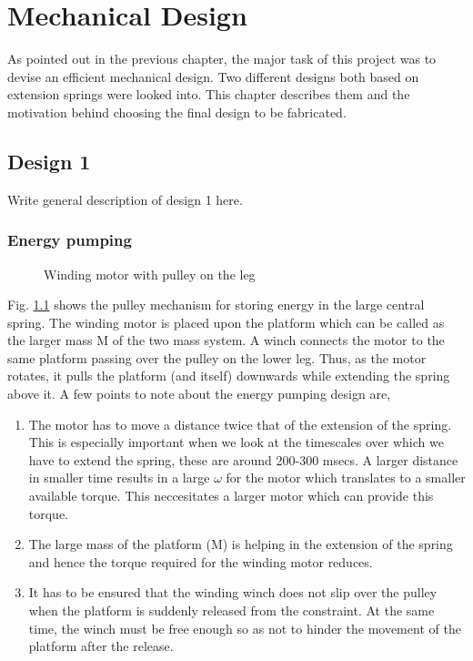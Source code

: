 \chapter{Mechanical Design}
\label{chap:mech_design}
As pointed out in the previous chapter, the major task of this project was to devise an efficient mechanical
design. Two different designs both based on extension springs were looked into. 
This chapter describes them and the motivation behind choosing the final design to be fabricated.

\section{Design 1}
Write general description of design 1 here.
\subsection{Energy pumping}
\begin{figure}[!h]
\centering
\caption{Winding motor with pulley on the leg}
\label{fig:3_pratik_design}
\end{figure}
Fig. \ref{fig:3_pratik_design} shows the pulley mechanism for storing energy in the large central spring.
The winding motor is placed upon the platform which can be called as the larger mass M of the two mass
system. A winch connects the motor to the same platform passing over the pulley on the lower leg. Thus, as
the motor rotates, it pulls the platform (and itself) downwards while extending the spring above it. 
A few points to note about the energy pumping design are,
\begin{enumerate}
\item
The motor has to move a distance twice that of the extension of the spring. This is
especially important when we look at the timescales over which we have to extend the spring, these are around
200-300 msecs. A larger distance in smaller time results in a large $\omega$ for the motor which translates
to a smaller available torque. This neccesitates a larger motor which can provide this torque. 
\item
The large mass of the platform (M) is helping in the extension of the spring and hence the torque required
for the winding motor reduces.
\item
It has to be ensured that the winding winch does not slip over the pulley when the platform is suddenly released from
the constraint. At the same time, the winch must be free enough so as not to hinder the movement of the platform after
the release.
\end{enumerate}

